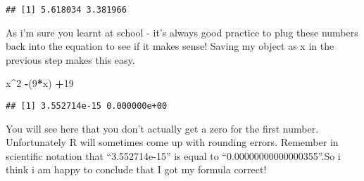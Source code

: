 \documentclass[
]{article}
\newenvironment{Shaded}{\begin{snugshade}}{\end{snugshade}}
\newcommand{\DecValTok}[1]{\textcolor[rgb]{0.00,0.00,0.81}{#1}}
\newcommand{\NormalTok}[1]{#1}
\newcommand{\OperatorTok}[1]{\textcolor[rgb]{0.81,0.36,0.00}{\textbf{#1}}}
\begin{document}
\begin{verbatim}
## [1] 5.618034 3.381966
\end{verbatim}

As i'm sure you learnt at school - it's always good practice to plug
these numbers back into the equation to see if it makes sense! Saving my
object as x in the previous step makes this easy.

\begin{Shaded}
\begin{Highlighting}[]
\NormalTok{x}\OperatorTok{^}\DecValTok{2} \OperatorTok{-}\NormalTok{(}\DecValTok{9}\OperatorTok{*}\NormalTok{x) }\OperatorTok{+}\DecValTok{19}
\end{Highlighting}
\end{Shaded}

\begin{verbatim}
## [1] 3.552714e-15 0.000000e+00
\end{verbatim}

You will see here that you don't actually get a zero for the first
number. Unfortunately R will sometimes come up with rounding errors.
Remember in scientific notation that ``3.552714e-15'' is equal to
``0.00000000000000355''.So i think i am happy to conclude that I got my
formula correct!
\end{document}
